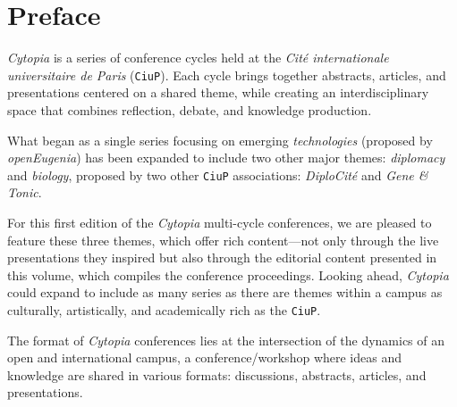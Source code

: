 


\cleardoublepage

\thispagestyle{empty}


\null

\cleardoublepage


\chapter*{Preface}\label{preface}


\emph{Cytopia} is a series of conference cycles held at the \emph{Cité
internationale universitaire de Paris} (\texttt{CiuP}). Each cycle
brings together abstracts, articles, and presentations centered on a
shared theme, while creating an interdisciplinary space that combines
reflection, debate, and knowledge production.

What began as a single series focusing on emerging \emph{technologies} (proposed by \emph{openEugenia})
has been expanded to include two other major themes: \emph{diplomacy}
and \emph{biology}, proposed by two other \texttt{CiuP} associations:
\emph{DiploCité} and \emph{Gene \& Tonic}.

For this first edition of the \emph{Cytopia} multi-cycle conferences, we
are pleased to feature these three themes, which offer rich
content---not only through the live presentations they inspired but also
through the editorial content presented in this volume, which compiles
the conference proceedings. Looking ahead, \emph{Cytopia} could expand
to include as many series as there are themes within a campus as
culturally, artistically, and academically rich as the \texttt{CiuP}.

The format of \emph{Cytopia} conferences lies at the intersection of the
dynamics of an open and international campus, a conference/workshop
where ideas and knowledge are shared in various formats: discussions,
abstracts, articles, and presentations.

